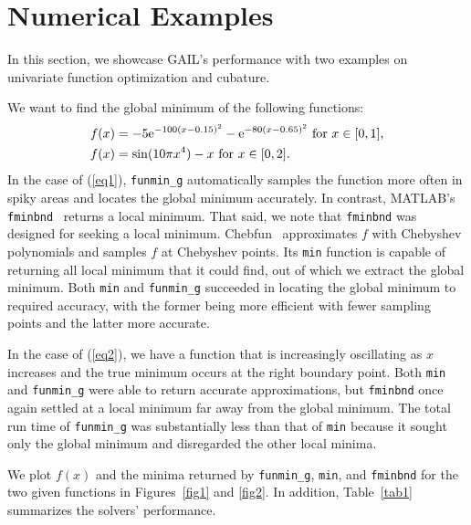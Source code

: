 \section{Numerical Examples}
\label{sec:ex}

In this section, we showcase GAIL's performance with two examples on
univariate function optimization and cubature.

\begin{example}\label{eg1} We want to find the global minimum of the following functions: 
\begin{align}
    f(x) &= -5 \mathrm{e}^{-100(x-0.15)^2}-\mathrm{e}^{ -80(x-0.65)^2}  \mbox{ for } x \in [0, 1], \label{eq1}
\\  f(x) &= \sin (10 \pi x^4 ) - x  \mbox{ for } x \in [0, 2]. \label{eq2}
\end{align}
In the case of (\ref{eq1}), \texttt{funmin\_g} automatically samples the
function more often in spiky areas and locates the global minimum
accurately. In contrast, MATLAB's
\texttt{fminbnd}~\cite{brent2013algorithms,forsythe1977computer} returns a
local minimum.  That said, we note that \texttt{fminbnd} was designed for
seeking a local minimum. Chebfun~\cite{TrefEtal17a} approximates $f$ with
Chebyshev polynomials and samples $f$ at Chebyshev points. Its \texttt{min} function is 
capable of returning all local minimum that it
could find, out of which we extract the global minimum. Both \texttt{min} and
\texttt{funmin\_g} succeeded in locating the global minimum to required
accuracy, with the former being more efficient with fewer sampling points
and the latter more accurate.


In the case of (\ref{eq2}), we have a function that is increasingly
oscillating as $x$ increases and the true minimum occurs at the right
boundary point. Both \texttt{min} and \texttt{funmin\_g} were able to return  
accurate approximations, but \texttt{fminbnd} once again settled at a local
minimum far away from the global minimum. The total run time of
\texttt{funmin\_g} was substantially less than that of \texttt{min} because it
sought only the global minimum and disregarded the other local minima.

We plot $f(x)$ and the minima returned by \texttt{funmin\_g}, \texttt{min},
and \texttt{fminbnd}  for the two given functions in Figures~\ref{fig1} and
\ref{fig2}. In addition, Table~\ref{tab1} summarizes the solvers'
performance.


\end{example}
